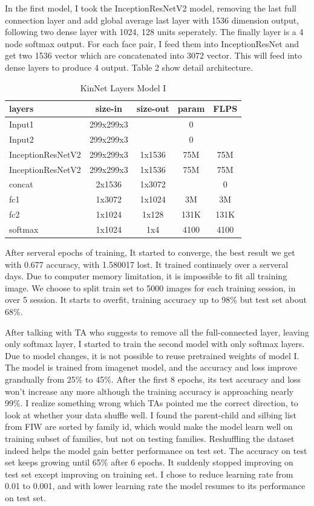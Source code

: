 \documentclass{article}
\begin{document}
In the first model, I took the InceptionResNetV2 model, removing the last full
connection layer and add global average last layer with 1536 dimension output,
following two dense layer with 1024, 128 units seperately. The finally layer is
a 4 node softmax output. For each face pair, I feed them into InceptionResNet
and get two 1536 vector which are concatenated into 3072 vector. This will feed
into dense layers to produce 4 output. Table 2 show detail architecture.

\begin{table}[h]
	\centering
	\begin{tabular}{ | l | c | c | c | c |}
		\hline
		\textbf{layers}&\textbf{size-in}&\textbf{size-out}&\textbf{param}&\textbf{FLPS}\\
		\hline
			Input1 & 299x299x3 & & 0 & \\
			Input2 & 299x299x3 & & 0 & \\
			InceptionResNetV2 & 299x299x3 & 1x1536 & 75M & 75M \\
			InceptionResNetV2 & 299x299x3 & 1x1536 & 75M & 75M \\
			concat & 2x1536 & 1x3072 & & 0 \\
			fc1 & 1x3072 & 1x1024 & 3M & 3M \\
			fc2 & 1x1024 & 1x128 & 131K & 131K \\
			softmax & 1x1024 & 1x4 & 4100 & 4100 \\
		\hline
	\end{tabular}
	\caption{KinNet Layers Model I}
	\label{table:2}
\end{table}

After serveral epochs of training, It started to converge, the best result we
get with 0.677 accuracy, with 1.580017 lost. It trained continuely over a
serveral days. Due to computer memory limitation, it is impossible to fit all
training image. We choose to split train set to 5000 images for each training
session, in over 5 session. It starts to overfit, training accuracy up to 98\%
but test set about 68\%.

After talking with TA who suggests to remove all the full-connected layer,
leaving only softmax layer, I started to train the second model with only
softmax layers. Due to model changes, it is not possible to reuse pretrained
weights of model I. The model is trained from imagenet model, and the accuracy
and loss improve grandually from  25\% to 45\%. After the first 8 epochs, its
test accuracy and loss won't increase any more although the training accuracy
is approaching nearly 99\%. I realize something wrong which TAs pointed me the
correct direction, to look at whether your data shuffle well. I found the
parent-child and silbing list from FIW are sorted by family id, which would
make the model learn well on training subset of families, but not on testing
families. Reshuffling the dataset indeed helps the model gain better
performance on test set.  The accuracy on test set keeps growing until 65\%
after 6 epochs. It suddenly stopped improving on test set except improving on
training set. I chose to reduce learning rate from 0.01 to 0.001, and with
lower learning rate the model resumes to its performance on test set.
\end{document}
